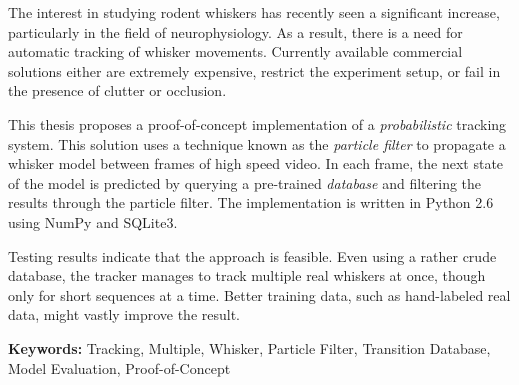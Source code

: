 The interest in studying rodent whiskers has recently seen a
significant increase, particularly in the field of neurophysiology. As
a result, there is a need for automatic tracking of whisker
movements. Currently available commercial solutions either are
extremely expensive, restrict the experiment setup, or fail in the
presence of clutter or occlusion.

This thesis proposes a proof-of-concept implementation of a
\emph{probabilistic} tracking system.  This solution uses a technique
known as the \emph{particle filter} to propagate a whisker model
between frames of high speed video.  In each frame, the next state of
the model is predicted by querying a pre-trained \emph{database} and
filtering the results through the particle filter. The implementation
is written in Python 2.6 using NumPy and SQLite3.

Testing results indicate that the approach is feasible. Even using a
rather crude database, the tracker manages to track multiple real
whiskers at once, though only for short sequences at a time. Better
training data, such as hand-labeled real data, might vastly improve
the result.

\textbf{Keywords:} Tracking, Multiple, Whisker, Particle Filter,
Transition Database, Model Evaluation, Proof-of-Concept
